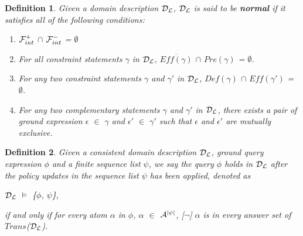 \documentclass[11pt, twocolumn]{article}
\newtheorem{vdefinition}{Definition}
\newenvironment{vquote}
  {\begin{list}{}{\leftmargin 1em}\item[]}
  {\end{list}}
\begin{document}
        \begin{vdefinition}
          Given a domain description ${\cal D_{L}}$, ${\cal D_{L}}$ is said to
          be {\bf normal} if it satisfies all of the following conditions:
          \begin{enumerate}
            \item
              ${\cal F}^{+}_{int}$ $\cap$ ${\cal F}^{-}_{int}$ = $\emptyset$
            \item
              For all constraint statements $\gamma$ in ${\cal D_{L}}$,
              $\overline{Eff(\gamma)}$ $\cap$ $Pre(\gamma)$ = $\emptyset$.
            \item
              For any two constraint statements $\gamma$ and $\gamma'$ in
              ${\cal D_{L}}$, $Def(\gamma)$ $\cap$ $Eff(\gamma')$ =
              $\emptyset$.
            \item
              For any two complementary statements $\gamma$ and $\gamma'$ in
              ${\cal D_{L}}$, there exists a pair of ground expression $\epsilon$
              $\in$ $\gamma$ and $\epsilon'$ $\in$ $\gamma'$ such that $\epsilon$ and
              $\epsilon'$ are mutually exclusive.
          \end{enumerate}
        \end{vdefinition}

        \begin{vdefinition}
          Given a consistent domain description ${\cal D}_{\cal L}$, ground
          query expression $\phi$ and a finite sequence list $\psi$, we say the
          query $\phi$ holds in ${\cal D}_{\cal L}$ after the policy updates
          in the sequence list $\psi$ has been applied, denoted as

          \begin{vquote}
            ${\cal D}_{\cal L}$ $\models$ \{$\phi$, $\psi$\},
          \end{vquote}

          \noindent if and only if for every atom $\alpha$ in $\phi$, $\alpha$
          $\in$ ${\cal A}^{|\psi|}$, [$\lnot$] $\alpha$ is in every answer
          set of $Trans$(${\cal D}_{\cal L}$).
        \end{vdefinition}
\end{document}
